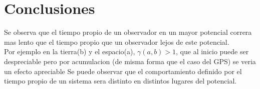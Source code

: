 \documentclass[12pt,twoside]{rif}
\begin{document}
	\section{Conclusiones}

Se observa que el tiempo propio de un observador en un mayor potencial correra mas lento que el tiempo propio que un observador lejos de este potencial.\\
Por ejemplo en la tierra(b) y el espacio(a), $\gamma(a,b)>1$, que al inicio puede ser despreciable pero por acumulacion (de misma forma que el caso del GPS) se veria un efecto apreciable
Se puede observar que el comportamiento definido por el tiempo propio de un sistema sera distinto en distintos lugares del potencial.
	\nocite{*}
	
	
	
\end{document}

